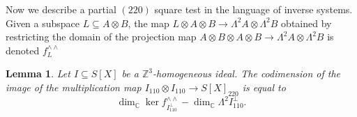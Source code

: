 \documentclass[12pt]{amsart}
\newtheorem{lemma}[theorem]{Lemma}
\theoremstyle{definition}
\theoremstyle{remark}
\theoremstyle{definition}
\newcommand{\CC}{\mathbb{C}}
\begin{document}
Now we describe a partial $(220)$ square test in the language of inverse systems. Given a subspace $L\subseteq A\otimes B$, the map $L\otimes A\otimes B \to \Lambda^2 A\otimes \Lambda^2 B$ obtained by restricting the domain of the projection map $A\otimes B\otimes A\otimes B \to \Lambda^2 A\otimes \Lambda^2 B$ is denoted $f^{\wedge \wedge}_L$ 


\begin{lemma}\label{lem:partial220ST}
    Let $I\subseteq S[X]$ be a $\mathbb{Z}^3$-homogeneous ideal. The codimension of the image of the multiplication map $I_{110}\otimes I_{110} \to S[X]_{220}$ is equal to 
    \begin{equation}\label{eq220ST}
    \dim_\CC \ker f^{\wedge \wedge}_{I_{110}^\perp} -\dim_\CC \Lambda^2 I_{110}^\perp.
    \end{equation}
\end{lemma}
\end{document}
